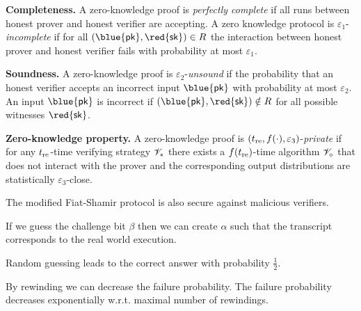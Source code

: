 \documentclass[landscape,footrule]{foils}
\renewcommand{\SK}{{\red{\mathsf{sk}}}}
\renewcommand{\PK}{{\blue{\mathsf{pk}}}}
\begin{document}
\enlargethispage{1cm}



\textbf{Completeness.} A zero-knowledge proof is \emph{perfectly
  complete} if all runs between honest prover and honest verifier are
accepting. A zero knowledge protocol is
$\varepsilon_1$-\emph{incomplete} if for all $(\PK,\SK)\in R$ the
interaction between honest prover and honest verifier fails with
probability at most $\varepsilon_1$.\vspace*{3ex}
 
\textbf{Soundness.} A zero-knowledge proof is
$\varepsilon_2$-\emph{unsound} if the probability that an honest
verifier accepts an incorrect input $\PK$ with probability at most
$\varepsilon_2$. An input $\PK$ is incorrect if $(\PK,\SK)\notin R$
for all possible witnesses $\SK$.\vspace*{3ex}

\textbf{Zero-knowledge property.}  A zero-knowledge proof is
$(t_{\mathrm{re}},f(\cdot),\varepsilon_3)$-\emph{private} if for any $t_{\mathrm{re}}$-time
verifying strategy $\mathscr{V}_*$ there exists a $f(t_{\mathrm{re}})$-time algorithm
$\mathscr{V}_{\circ}$ that does not interact with the prover and the
corresponding output distributions are statistically
$\varepsilon_3$-close.\vspace*{-2ex}






The modified Fiat-Shamir protocol is also secure against malicious verifiers.

\begin{triangles}
\item If we guess the challenge bit $\beta$ then we can create
  $\alpha$ such that the transcript corresponds to the real world
  execution.
\item Random guessing leads to the correct answer with probability
  $\frac{1}{2}$.
\item By rewinding we can decrease the failure probability. The
  failure probability decreases exponentially w.r.t. maximal number of rewindings.
\end{triangles}
\end{document}
